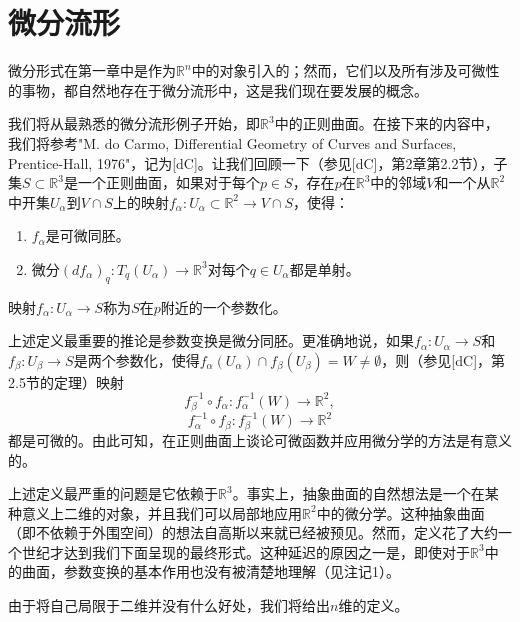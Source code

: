 \documentclass[12pt,a4paper]{ctexbook}
\begin{document}
\chapter{微分流形}

微分形式在第一章中是作为$\mathbb{R}^n$中的对象引入的；然而，它们以及所有涉及可微性的事物，都自然地存在于微分流形中，这是我们现在要发展的概念。

我们将从最熟悉的微分流形例子开始，即$\mathbb{R}^3$中的正则曲面。在接下来的内容中，我们将参考"M. do Carmo, Differential Geometry of Curves and Surfaces, Prentice-Hall, 1976"，记为[dC]。让我们回顾一下（参见[dC]，第2章第2.2节），子集$S\subset\mathbb{R}^3$是一个正则曲面，如果对于每个$p\in S$，存在$p$在$\mathbb{R}^3$中的邻域$V$和一个从$\mathbb{R}^2$中开集$U_\alpha$到$V\cap S$上的映射$f_\alpha:U_\alpha\subset\mathbb{R}^2\to V\cap S$，使得：
\begin{enumerate}
    \item $f_\alpha$是可微同胚。
    \item 微分$(df_\alpha)_q:T_q(U_\alpha)\to\mathbb{R}^3$对每个$q\in U_\alpha$都是单射。
\end{enumerate}

映射$f_\alpha:U_\alpha\to S$称为$S$在$p$附近的一个参数化。

上述定义最重要的推论是参数变换是微分同胚。更准确地说，如果$f_\alpha:U_\alpha\to S$和$f_\beta:U_\beta\to S$是两个参数化，使得$f_\alpha(U_\alpha)\cap f_\beta(U_\beta)=W\neq\emptyset$，则（参见[dC]，第2.5节的定理）映射
$$f_\beta^{-1}\circ f_\alpha:f_\alpha^{-1}(W)\to\mathbb{R}^2,$$
$$f_\alpha^{-1}\circ f_\beta:f_\beta^{-1}(W)\to\mathbb{R}^2$$
都是可微的。由此可知，在正则曲面上谈论可微函数并应用微分学的方法是有意义的。

上述定义最严重的问题是它依赖于$\mathbb{R}^3$。事实上，抽象曲面的自然想法是一个在某种意义上二维的对象，并且我们可以局部地应用$\mathbb{R}^2$中的微分学。这种抽象曲面（即不依赖于外围空间）的想法自高斯以来就已经被预见。然而，定义花了大约一个世纪才达到我们下面呈现的最终形式。这种延迟的原因之一是，即使对于$\mathbb{R}^3$中的曲面，参数变换的基本作用也没有被清楚地理解（见注记1）。

由于将自己局限于二维并没有什么好处，我们将给出$n$维的定义。
\end{document}
